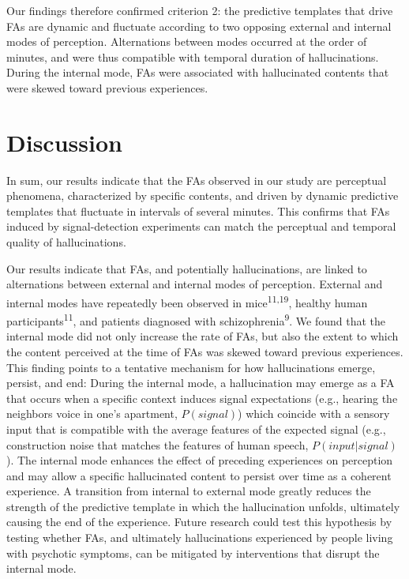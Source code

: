 \documentclass[
]{article}
\begin{document}
Our findings therefore confirmed criterion 2: the predictive templates
that drive FAs are dynamic and fluctuate according to two opposing
external and internal modes of perception. Alternations between modes
occurred at the order of minutes, and were thus compatible with temporal
duration of hallucinations. During the internal mode, FAs were
associated with hallucinated contents that were skewed toward previous
experiences.

\hypertarget{discussion}{%
\section{Discussion}\label{discussion}}

In sum, our results indicate that the FAs observed in our study are
perceptual phenomena, characterized by specific contents, and driven by
dynamic predictive templates that fluctuate in intervals of several
minutes. This confirms that FAs induced by signal-detection experiments
can match the perceptual and temporal quality of hallucinations.

Our results indicate that FAs, and potentially hallucinations, are
linked to alternations between external and internal modes of
perception. External and internal modes have repeatedly been observed in
mice\textsuperscript{11,19}, healthy human
participants\textsuperscript{11}, and patients diagnosed with
schizophrenia\textsuperscript{9}. We found that the internal mode did
not only increase the rate of FAs, but also the extent to which the
content perceived at the time of FAs was skewed toward previous
experiences. This finding points to a tentative mechanism for how
hallucinations emerge, persist, and end: During the internal mode, a
hallucination may emerge as a FA that occurs when a specific context
induces signal expectations (e.g., hearing the neighbors voice in one's
apartment, \(P(signal)\)) which coincide with a sensory input that is
compatible with the average features of the expected signal (e.g.,
construction noise that matches the features of human speech,
\(P(input|signal)\)). The internal mode enhances the effect of preceding
experiences on perception and may allow a specific hallucinated content
to persist over time as a coherent experience. A transition from
internal to external mode greatly reduces the strength of the predictive
template in which the hallucination unfolds, ultimately causing the end
of the experience. Future research could test this hypothesis by testing
whether FAs, and ultimately hallucinations experienced by people living
with psychotic symptoms, can be mitigated by interventions that disrupt
the internal mode.
\end{document}
